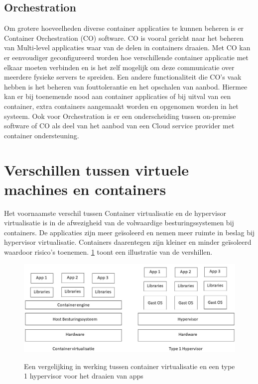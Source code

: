 \subsection{Orchestration}
Om grotere hoeveelheden diverse container applicaties te kunnen beheren is er Container Orchestration (CO) software. CO is vooral gericht naar het beheren van Multi-level applicaties waar van de delen in containers draaien. Met CO kan er eenvoudiger geconfigureerd worden hoe verschillende container applicatie met elkaar moeten verbinden en is het zelf mogelijk om deze communicatie over meerdere fysieke servers te spreiden. Een andere functionaliteit die CO’s vaak hebben is het beheren van fouttolerantie en het opschalen van aanbod. Hiermee kan er bij toenemende nood aan container applicaties of  bij uitval van een container, extra containers aangemaakt worden en opgenomen worden in het systeem. Ook voor Orchestration is er een onderscheiding tussen on-premise software of CO als deel van het aanbod van een Cloud service provider met container ondersteuning\autocite{Casalicchio2020,Truyen2019}.


\section{Verschillen tussen virtuele machines en containers}
Het voornaamste verschil tussen Container virtualisatie en de hypervisor virtualisatie is in de afwezigheid van de volwaardige besturingssystemen bij containers. De applicaties zijn meer geïsoleerd en nemen meer ruimte in beslag bij hypervisor virtualisatie. Containers daarentegen zijn kleiner en minder geïsoleerd waardoor risico’s toenemen. \ref{fig:containerVShypervisor} toont een illustratie van de vershillen.

\begin{figure}[h]
    \includegraphics[width=\linewidth]{img/containerVShyper.jpg}
    \label{fig:containerVShypervisor}
    \caption[Vergelijking container virtualisatie en type 1 hypervisor]{Een vergelijking in werking tussen container virtualisatie en een type 1 hypervisor voor het draaien van apps}
    \centering
\end{figure}

